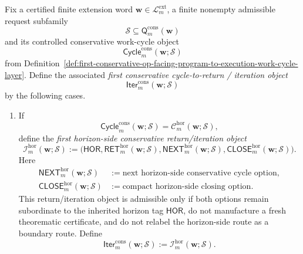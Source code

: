 \begin{definition}
\label{def:first-conservative-cycle-to-return-iteration-interface}
Fix a certified finite extension word \(\mathbf w\in\mathcal L^{\mathrm{ext}}_{m}\), a finite nonempty admissible request subfamily
\[
 \mathcal S \subseteq \mathsf{Q}^{\mathrm{cons}}_{m}(\mathbf w)
\]
and its controlled conservative work-cycle object
\[
 \mathsf{Cycle}^{\mathrm{cons}}_{m}(\mathbf w;\mathcal S)
\]
from Definition~\ref{def:first-conservative-op-facing-program-to-execution-work-cycle-layer}. Define the associated \emph{first conservative cycle-to-return / iteration object}
\[
 \mathsf{Iter}^{\mathrm{cons}}_{m}(\mathbf w;\mathcal S)
\]
by the following cases.
\begin{enumerate}[label=(\roman*)]
 \item If
 {\small
\[
 \mathsf{Cycle}^{\mathrm{cons}}_{m}(\mathbf w;\mathcal S)
 =
 \mathcal C^{\mathrm{hor}}_{m}(\mathbf w;\mathcal S),
 \]
}
define the \emph{first horizon-side conservative return/iteration object}
\[
 \mathcal I^{\mathrm{hor}}_{m}(\mathbf w;\mathcal S)
 :=
 \bigl(
 \mathsf{HOR},
 \mathsf{RET}^{\mathrm{hor}}_{m}(\mathbf w;\mathcal S),
 \mathsf{NEXT}^{\mathrm{hor}}_{m}(\mathbf w;\mathcal S),
 \mathsf{CLOSE}^{\mathrm{hor}}_{m}(\mathbf w;\mathcal S)
 \bigr).
\]
Here
\begin{align*}
 \mathsf{NEXT}^{\mathrm{hor}}_{m}(\mathbf w;\mathcal S)
 &:= \text{next horizon-side conservative cycle option},\\
 \mathsf{CLOSE}^{\mathrm{hor}}_{m}(\mathbf w;\mathcal S)
 &:= \text{compact horizon-side closing option}.
\end{align*}
This return/iteration object is admissible only if both options remain subordinate to the inherited horizon tag \(\mathsf{HOR}\), do not manufacture a fresh theorematic certificate, and do not relabel the horizon-side route as a boundary route. Define
\[
 \mathsf{Iter}^{\mathrm{cons}}_{m}(\mathbf w;\mathcal S)
 :=
 \mathcal I^{\mathrm{hor}}_{m}(\mathbf w;\mathcal S).
\]


\end{enumerate}
\end{definition}
